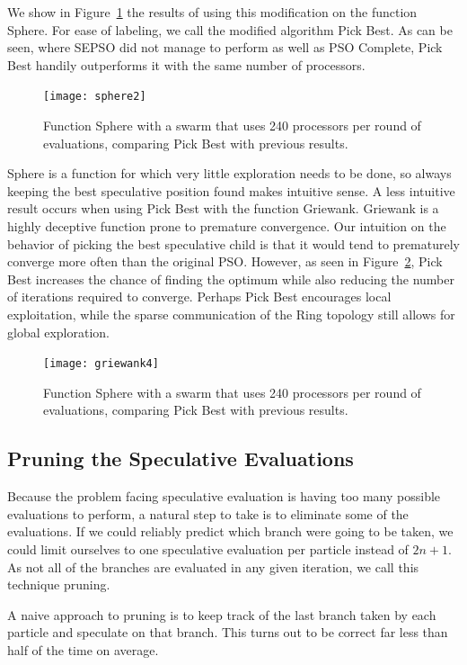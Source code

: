 \documentclass[journal,letterpaper]{IEEEtran}
\newcommand{\fig}[1]{Figure~\ref{fig:#1}}
\begin{document}
We show in \fig{sphere-pickbest} the results of using this modification on the
function Sphere.  For ease of labeling, we call the modified algorithm Pick
Best.  As can be seen, where SEPSO did not manage to perform as well as PSO
Complete, Pick Best handily outperforms it with the same number of processors.

\begin{figure}
  \centering
  \texttt{[image: sphere2]}
  \caption{Function Sphere with a swarm that uses 240 processors per round of
  evaluations, comparing Pick Best with previous results.}
  \label{fig:sphere-pickbest}
\end{figure}

Sphere is a function for which very little exploration needs to be done, so
always keeping the best speculative position found makes intuitive sense.  A
less intuitive result occurs when using Pick Best with the function Griewank.
Griewank is a highly deceptive function prone to premature convergence.  Our
intuition on the behavior of picking the best speculative child is that it
would tend to prematurely converge more often than the original PSO.  However,
as seen in \fig{griewank-pickbest}, Pick Best increases the chance of finding
the optimum while also reducing the number of iterations required to converge.
Perhaps Pick Best encourages local exploitation, while the sparse communication
of the Ring topology still allows for global exploration.

\begin{figure}
  \centering
  \texttt{[image: griewank4]}
  \caption{Function Sphere with a swarm that uses 240 processors per round of
  evaluations, comparing Pick Best with previous results.}
  \label{fig:griewank-pickbest}
\end{figure}

\subsection{Pruning the Speculative Evaluations}
\label{sec:pruning}

Because the problem facing speculative evaluation is having too many possible
evaluations to perform, a natural step to take is to eliminate some of the
evaluations.  If we could reliably predict which branch were going to be taken,
we could limit ourselves to one speculative evaluation per particle instead of
$2n+1$.  As not all of the branches are evaluated in any given iteration, we
call this technique pruning.  

A naive approach to pruning is to keep track of the last branch taken by each
particle and speculate on that branch.  This turns out to be correct far less
than half of the time on average.
\end{document}
